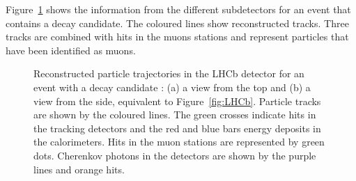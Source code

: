 Figure~\ref{fig:event} shows the information from the different subdetectors for an event that contains a \BstoJpsiKK{} decay candidate.
The coloured lines show reconstructed tracks. Three tracks are combined with hits in the muons stations and represent particles that have
been identified as muons.
\begin{figure}[ptb]
  \centering
  \caption{Reconstructed particle trajectories in the LHCb detector for an event with a \BstoJpsiKK{} decay candidate \cite{vanEijk:2012}:
           (a) a view from the top and (b) a view from the side, equivalent to Figure~\ref{fig:LHCb}.
           Particle tracks are shown by the coloured lines. The green crosses indicate hits in the tracking detectors and the red and blue
           bars energy deposits in the calorimeters. Hits in the muon stations are represented by green dots. Cherenkov photons in the
           \rich{} detectors are shown by the purple lines and orange hits.}
  \label{fig:event}
\end{figure}
